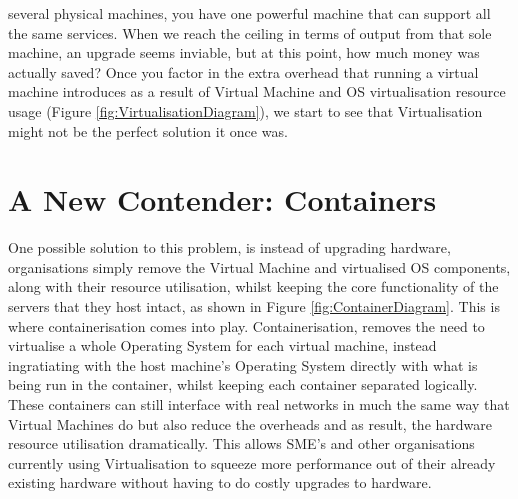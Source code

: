 several physical machines, you have one powerful machine that can support all the same services. When we reach the ceiling in terms of output from that sole machine, an upgrade seems inviable, but at this point, how much money was actually saved? Once you factor in the extra overhead that running a virtual machine introduces as a result of Virtual Machine and OS virtualisation resource usage (Figure \ref{fig:VirtualisationDiagram}), we start to see that Virtualisation might not be the perfect solution it once was.



\section{A New Contender: Containers}
One possible solution to this problem, is instead of upgrading hardware, organisations simply remove the Virtual Machine and virtualised OS components, along with their resource utilisation, whilst keeping the core functionality of the servers that they host intact, as shown in Figure \ref{fig:ContainerDiagram}. This is where containerisation comes into play. Containerisation, removes the need to virtualise a whole Operating System for each virtual machine, instead ingratiating with the host machine's Operating System directly with what is being run in the container, whilst keeping each container separated logically. These containers can still interface with real networks in much the same way that Virtual Machines do but also reduce the overheads and as result, the hardware resource utilisation dramatically. This allows SME's and other organisations currently using Virtualisation to squeeze more performance out of their already existing hardware without having to do costly upgrades to hardware.

